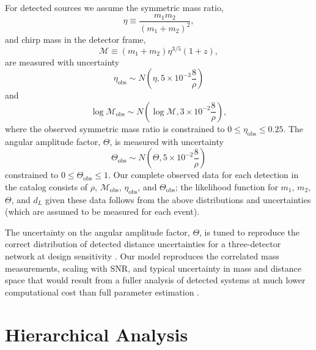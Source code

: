 \documentclass[modern]{aastex62}
\newcommand{\mchirp}{\mathcal{M}}
\begin{document}
For detected sources we assume the symmetric mass ratio,
%
\begin{equation}
  \eta \equiv \frac{m_1 m_2}{\left( m_1 + m_2 \right)^2},
\end{equation}
%
and chirp mass in the detector frame,
%
\begin{equation}
  \mchirp \equiv \left( m_1 + m_2 \right) \eta^{3/5} \left( 1 + z \right),
\end{equation}
%
are measured with uncertainty
%
\begin{equation}
  \eta_\mathrm{obs} \sim N\left( \eta, 5 \times 10^{-3} \frac{8}{\rho} \right)
\end{equation}
%
and
%
\begin{equation}
  \log \mchirp_\mathrm{obs} \sim N\left( \log \mchirp, 3 \times 10^{-2} \frac{8}{\rho} \right),
\end{equation}
%
where the observed symmetric mass ratio is constrained to $0 \leq
\eta_\mathrm{obs} \leq 0.25$.  The angular amplitude factor, $\Theta$, is
measured with uncertainty
%
\begin{equation}
  \Theta_\mathrm{obs} \sim N\left( \Theta, 5 \times 10^{-2} \frac{8}{\rho} \right)
\end{equation}
%
constrained to $0 \leq \Theta_\mathrm{obs} \leq 1$.  Our complete observed data
for each detection in the catalog consists of $\rho$, $\mchirp_\mathrm{obs}$,
$\eta_\mathrm{obs}$, and $\Theta_\mathrm{obs}$; the likelihood function for
$m_1$, $m_2$, $\Theta$, and $d_L$ given these data follows from the above
distributions and uncertainties (which are assumed to be measured for each
event).

The uncertainty on the angular amplitude factor, $\Theta$, is tuned to reproduce
the correct distribution of detected distance uncertainties for a three-detector
network at design sensitivity \citep{Vitale2017}. Our model reproduces the
correlated mass measurements, scaling with \ac{SNR}, and typical uncertainty in
mass and distance space that would result from a fuller analysis of detected
systems at much lower computational cost than full parameter estimation
\citep{Veitch2015}.

\section{Hierarchical Analysis}
\label{sec:hierarchical}
\end{document}
